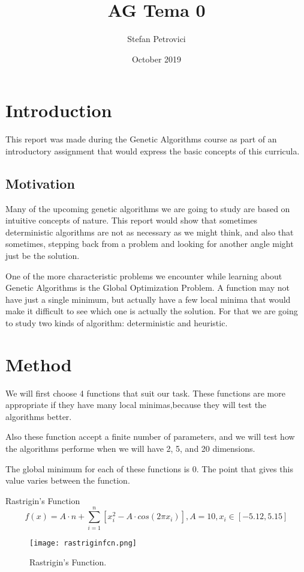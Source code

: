 \documentclass{article}
\title{AG Tema 0}
\author{Stefan Petrovici}
\date{October 2019}
\begin{document}
\maketitle

\section{Introduction}
This report was made during the Genetic Algorithms course as part of an introductory     assignment that would express the basic concepts of this curricula.

\subsection{Motivation}
Many of the upcoming genetic algorithms we are going to study are based on intuitive concepts of nature. This report would show that sometimes deterministic algorithms are not as necessary as we might think, and also that sometimes, stepping back from a problem and looking for another angle might just be the solution.

One of the more characteristic problems we encounter while learning about Genetic Algorithms is the Global Optimization Problem. A function may not have just a single minimum, but actually have a few local minima that would make it difficult to see which one is actually the solution. For that we are going to study two kinds of algorithm: deterministic and heuristic.

\section{Method}

We will first choose 4 functions\cite{benchmarking} that suit our task. These functions are more appropriate if they have many local minimas,because they will test the algorithms better.

Also these function accept a finite number of parameters, and we will test how the algorithms performe when we will have 2, 5, and 20 dimensions.

The global minimum for each of these functions is 0. The point that gives this value varies between the function.

\break

Rastrigin's Function
$$ f(x) = A \cdot n + \sum_{i=1}^n \left[ x_i^2 - A \cdot cos(2 \pi x_i) \right],
A = 10, x_i \in \left[ -5.12, 5.15 \right]$$
\begin{figure}[!h]
  \centering
  \texttt{[image: rastriginfcn.png]}
  \caption{Rastrigin's Function.}
\end{figure}
\end{document}
